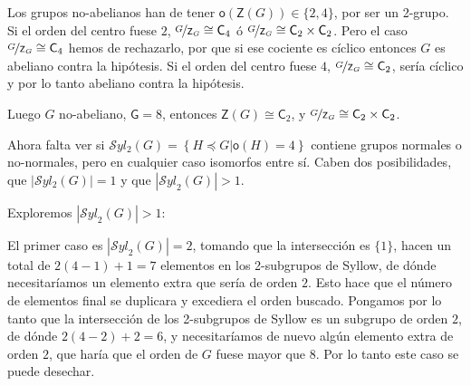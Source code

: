 \documentclass[12pt,a4paper,fleqn,spanish,final,openright]{extbook}
\theoremstyle{definition}
\theoremstyle{remark}
\begin{document}
     
    
    
    Los grupos no-abelianos han de tener $\mathsf{o}\left(\mathsf{Z}(G)\right) \in \{2,4\}$, por ser un 2-grupo. Si el orden del centro fuese $2$, $\nicefrac{G}{\mathsf{Z}_{G}}\cong \mathsf{C}_{4}$ ó $\nicefrac{G}{\mathsf{Z}_{G}}\cong \mathsf{C}_{2}\times\mathsf{C}_{2}$. Pero el caso $\nicefrac{G}{\mathsf{Z}_{G}}\cong \mathsf{C}_{4}$ hemos de rechazarlo, por que si ese cociente es cíclico entonces $G$ es abeliano contra la hipótesis. Si el orden del centro fuese $4$, $\nicefrac{G}{\mathsf{Z}_{G}}\cong \mathsf{C}_{2}$, sería cíclico y por lo tanto abeliano contra la hipótesis.
    
    Luego $G$ no-abeliano, $\mathsf{G}=8$, entonces $\mathsf{Z}\left(G\right)\cong\mathsf{C}_{2}$, y $\nicefrac{G}{\mathsf{Z}_{G}}\cong \mathsf{C}_{2}\times\mathsf{C}_{2}$.
    
    Ahora falta ver si $\mathcal{S}yl_{2}(G)=\left\lbrace H\preccurlyeq G \vert \mathsf{o}(H)=4 \right\rbrace$ contiene grupos normales o no-normales, pero en cualquier caso isomorfos entre sí. Caben dos posibilidades, que $\left| \mathcal{S}yl_2 (G)\right|=1$ y que $\left| {{\mathcal{S}yl}_{2}}(G)\right|>1$.
    
    Exploremos $\left| {{\mathcal{S}yl}_{2}}(G)\right|>1$:
    
    El primer caso es $\left| {{\mathcal{S}yl}_{2}}(G)\right|=2$, 
tomando que la intersección es $\{1\}$, hacen un total de $2(4-1)+1=7$ elementos 
en los 2-subgrupos de Syllow, de dónde necesitaríamos un elemento extra que sería 
de orden $2$. Esto hace que el número de elementos final se duplicara y excediera 
el orden buscado. Pongamos por lo tanto que la intersección de los 2-subgrupos de 
Syllow es un subgrupo de orden $2$, de dónde $2(4-2)+2=6$, y necesitaríamos de nuevo 
algún elemento extra de orden $2$, que haría que el orden de $G$ fuese mayor que $8$. 
Por lo tanto este caso se puede desechar.
    
\end{document}
